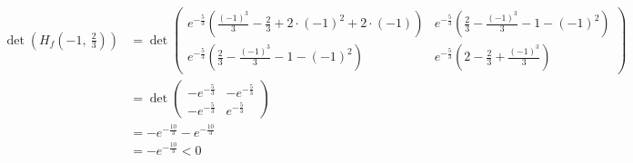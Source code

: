 \documentclass[10pt]{article}
\begin{document}
\begin{align*}
	\det \left(H_f\left(-1, \ \frac 23 \right) \right)
	&= \det
	\begin{pmatrix}
	e^{-\frac53} \left(\frac{(-1)^3}{3} - \frac23 + 
			2 \cdot (-1)^2 + 2 \cdot (-1) \right) &
	e^{-\frac53} \left( \frac23 - \frac{(-1)^3}3 - 1 - (-1)^2\right) \\
	e^{-\frac53} \left( \frac23 - \frac{(-1)^3}3 - 1 - (-1)^2\right) &
	e^{-\frac53} \left(2 - \frac23 + \frac{(-1)^3}3 \right)
	\end{pmatrix} \\
	&= \det
	\begin{pmatrix}
	-e^{-\frac53} &
	-e^{-\frac53} \\
	-e^{-\frac53} &
	e^{-\frac53} 
	\end{pmatrix} \\
	&= -e^{-\frac{10}{3}} - e^{-\frac{10}{3}} \\
	&= -e^{-\frac{10}{3}} < 0
\end{align*}

\newpage
	
\end{document}
